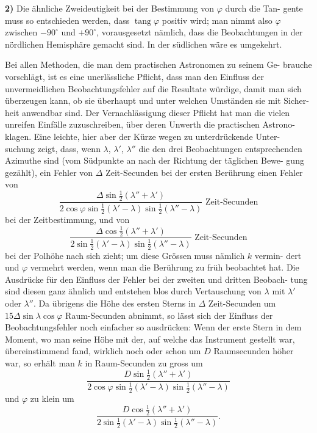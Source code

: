 \documentclass[12pt,a4paper]{article}
\DeclareMathOperator{\tang}{tang}
\begin{document}
\textbf{2)} Die ähnliche Zweideutigkeit bei der Bestimmung von $\varphi$ durch die Tan-
gente muss so entschieden werden, dass $\tang\varphi$ positiv wird; man nimmt also
$\varphi$ zwischen $-90^{\circ}$ und $+90^{\circ}$, vorausgesetzt nämlich, dass die Beobachtungen
in der nördlichen Hemisphäre gemacht sind. In der südlichen wäre es umgekehrt.

Bei allen Methoden, die man dem practischen Astronomen zu seinem Ge-
brauche vorschlägt, ist es eine unerlässliche Pflicht, dass man den Einfluss der
unvermeidlichen Beobachtungsfehler auf die Resultate würdige, damit man sich
überzeugen kann, ob sie überhaupt und unter welchen Umständen sie mit Sicher-
heit anwendbar sind. Der Vernachlässigung dieser Pflicht hat man die vielen
unreifen Einfälle zuzuschreiben, über deren Unwerth die practischen Astrono-
klagen. Eine leichte, hier aber der Kürze wegen zu unterdrückende Unter-
suchung zeigt, dass, wenn $\lambda$, $\lambda'$, $\lambda''$ die den drei Beobachtungen entsprechenden
Azimuthe sind (vom Südpunkte an nach der Richtung der täglichen Bewe-
gung gezählt), ein Fehler von $\Delta$ Zeit-Secunden bei der ersten Berührung einen
Fehler von
\[
\frac{\Delta\sin\frac{1}{2}(\lambda''+\lambda')}{2\cos\varphi\sin\frac{1}{2}(\lambda'-\lambda)\sin\frac{1}{2}(\lambda''-\lambda)} \text{ Zeit-Secunden}
\]
bei der Zeitbestimmung, und von
\[
\frac{\Delta\cos\frac{1}{2}(\lambda''+\lambda')}{2\sin\frac{1}{2}(\lambda'-\lambda)\sin\frac{1}{2}(\lambda''-\lambda)} \text{ Zeit-Secunden}
\]
bei der Polhöhe nach sich zieht; um diese Grössen muss nämlich $k$ vermin-
dert und $\varphi$ vermehrt werden, wenn man die Berührung zu früh beobachtet hat.
Die Ausdrücke für den Einfluss der Fehler bei der zweiten und dritten Beobach-
tung sind diesen ganz ähnlich und entstehen blos durch Vertauschung von $\lambda$
mit $\lambda'$ oder $\lambda''$. Da übrigens die Höhe des ersten Sterns in $\Delta$ Zeit-Secunden
um $15\Delta\sin\lambda\cos\varphi$ Raum-Secunden abnimmt, so lässt sich der Einfluss
der Beobachtungsfehler noch einfacher so ausdrücken: Wenn der erste Stern in
dem Moment, wo man seine Höhe mit der, auf welche das Instrument gestellt
war, übereinstimmend fand, wirklich noch oder schon um $D$ Raumsecunden
höher war, so erhält man $k$ in Raum-Secunden zu gross um
\[
\frac{D\sin\frac{1}{2}(\lambda''+\lambda')}{2\cos\varphi\sin\frac{1}{2}(\lambda'-\lambda)\sin\frac{1}{2}(\lambda''-\lambda)}
\]
und $\varphi$ zu klein um
\[
\frac{D\cos\frac{1}{2}(\lambda''+\lambda')}{2\sin\frac{1}{2}(\lambda'-\lambda)\sin\frac{1}{2}(\lambda''-\lambda)}.
\]
\end{document}
